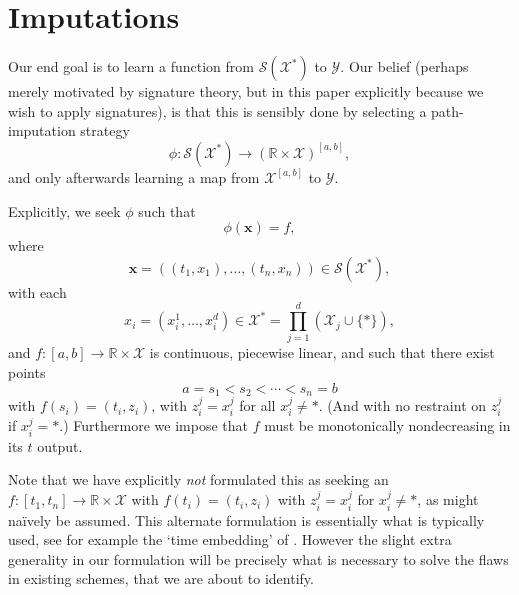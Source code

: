 \documentclass{article}
\newcommand{\reals}{\mathbb{R}}
\newcommand{\dataspace}{\mathcal{X}}
\newcommand{\lspace}{\mathcal{Y}}
\newcommand{\seriesspace}{\mathcal{S}}
\begin{document}
\section{Imputations}

Our end goal is to learn a function from $\seriesspace(\dataspace^*)$ to $\lspace$. Our belief (perhaps merely motivated by signature theory, but in this paper explicitly because we wish to apply signatures), is that this is sensibly done by selecting a path-imputation strategy
\begin{equation*}
    \phi \colon \seriesspace(\dataspace^*) \to (\reals \times \dataspace)^{[a, b]},
\end{equation*}
and only afterwards learning a map from $\dataspace^{[a, b]}$ to $\lspace$.

Explicitly, we seek $\phi$ such that
\begin{equation}\label{eq:phi}
\phi(\mathbf{x}) = f,    
\end{equation}
where
\begin{equation*}
\mathbf{x} = ((t_1, x_1), \ldots, (t_n, x_n)) \in \seriesspace(\dataspace^*),    
\end{equation*}
with each
\begin{equation*}
    x_i = (x_i^1, \ldots, x_i^d) \in \dataspace^* = \prod_{j = 1}^d (\dataspace_j \cup \{*\}),
\end{equation*}
and $f \colon [a, b] \to \reals \times \dataspace$ is continuous, piecewise linear, and such that there exist points
\begin{equation}\label{eq:ss}
a = s_1 < s_2 < \cdots < s_n = b    
\end{equation}
with $f(s_i) = (t_i, z_i)$, with $z_i^j = x_i^j$ for all $x_i^j \neq *$. (And with no restraint on $z_i^j$ if $x_i^j = *$.) Furthermore we impose that $f$ must be monotonically nondecreasing in its $t$ output.



Note that we have explicitly \emph{not} formulated this as seeking an $f \colon [t_1, t_n] \to \reals \times \dataspace$ with $f(t_i) = (t_i, z_i)$ with $z_i^j = x_i^j$ for $x_i^j \neq *$, as might na{\"i}vely be assumed. This alternate formulation is essentially what is typically used, see for example the `time embedding' of \cite{fermanian2019embedding}. However the slight extra generality in our formulation will be precisely what is necessary to solve the flaws in existing schemes, that we are about to identify.
\end{document}
